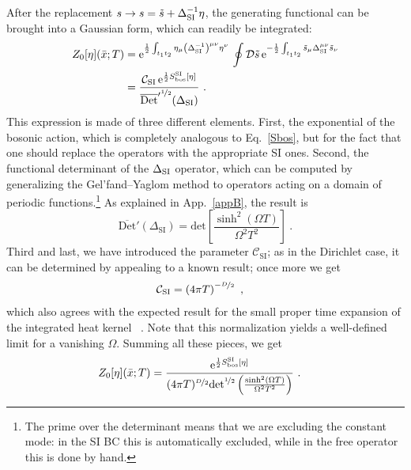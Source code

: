 \documentclass[12pt,a4paper]{article}
\numberwithin{equation}{section}
\numberwithin{equation}{section}
\begin{document}
After the replacement $s \to {s}=\tilde s+\Delta_{\rm SI}^{-1}\eta$, the generating functional can be brought into a Gaussian form, which can readily be integrated:
\begin{align} \label{3.44}
\begin{split}
Z_0[\eta](\bar{x};T)&= \mathrm{e}^{\frac12\int_{t_1t_2} \eta_\mu \left(\Delta^{-1}_{\rm SI}\right)^{\mu\nu}\eta^\nu} \, \oint \mathcal{D}\tilde{s} \, \mathrm{e}^{-\frac12\int_{t_1t_2} \tilde{s}_\mu\Delta^{\mu\nu}_{\rm SI} \tilde{s}_\nu}\\
&=\frac{\mathcal{C}_{\mathrm{SI}} \, \mathrm{e}^{\frac12 S^{\rm SI}_{\mathrm{bos}}[\eta]}}{{{\overline{\mathrm{Det}}}'}^{\nicefrac{1}{2}}(\Delta_{\mathrm{SI}})}\ .
\end{split}
\end{align}
This expression is made of three different elements. First, the exponential of the bosonic action, which is completely analogous to Eq.~\eqref{Sbos}, but for the fact that one should replace the operators with the appropriate SI ones. 
Second, the functional determinant of the $\Delta_{\rm SI}$ operator, which can be computed by generalizing the Gel’fand–Yaglom method to operators acting on a domain of periodic functions.\footnote{The prime over the determinant means that we are excluding the constant mode: in the SI BC this is automatically excluded, while in the free operator this is done by hand.} As explained in App.~\ref{appB}, the result is
\begin{equation}
\overline{\mathrm{Det}}'(\Delta_{\mathrm{SI}})=\mathrm{det}\left[ \frac{\sinh^2(\Omega T)}{\Omega^2T^2} \right]\ .
\end{equation}
Third and last, we have introduced the parameter $\mathcal{C}_{\mathrm{SI}}$; as in the Dirichlet case, it can be determined by appealing to a known result; once more we get
\begin{align} \label{CSI}
&\mathcal{C}_{\mathrm{SI}} = \left( 4\pi T \right)^{-\nicefrac{D}{2}}\ ,
\end{align}
which also agrees with the expected result for the small proper time expansion of the integrated heat kernel~ \cite{Vassilevich:2003xt}. Note that this normalization yields a well-defined limit for a vanishing $\Omega$.
Summing all these pieces, we get
\begin{align} \label{Z0}
\begin{split}
Z_0[\eta](\bar{x};T)&= \frac{ \mathrm{e}^{\frac12 S^{\rm SI}_{\mathrm{bos}}[\eta]}}{(4\pi T)^{\nicefrac{D}{2}}\mathrm{det}^{\nicefrac{1}{2}}\left(\frac{\sinh^2(\Omega T)}{\Omega^2T^2}\right)}\ .
\end{split}
\end{align}
\end{document}
